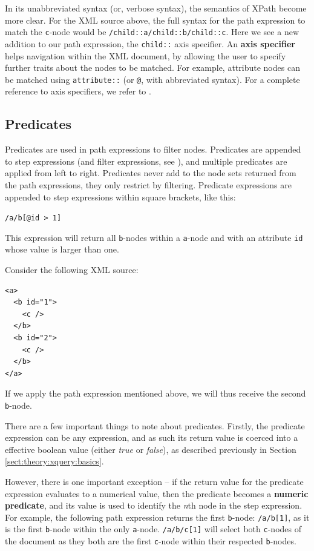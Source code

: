In its unabbreviated syntax (or, verbose syntax), the semantics of XPath
become more clear. For the XML source above, the full syntax for the path
expression to match the \verb!c!-node would be
\texttt{/child::a/child::b/child::c}. Here we see a new addition to our path
expression, the \verb!child::! axis specifier. An \textbf{axis specifier} helps
navigation within the XML document, by allowing the user to specify further
traits about the nodes to be matched. For example, attribute nodes can be
matched using \verb!attribute::! (or \verb!@!, with abbreviated syntax). For a
complete reference to axis specifiers, we refer to \cite{w3c01}.

\subsection{Predicates}
\label{sect:theory:xquery:Predicates}
Predicates are used in path expressions to filter nodes. Predicates are
appended to step expressions (and filter expressions, see \cite{w3c01}), and multiple predicates
are applied from left to right. Predicates never add to the node sets returned from the path expressions, they
only restrict by filtering. Predicate expressions are appended to step expressions within square brackets, like
this:
\begin{center}
\verb!/a/b[@id > 1]!
\end{center} 
This expression will return all \verb!b!-nodes within a \verb!a!-node and with an attribute \verb!id! whose value
is larger than one.

Consider the following XML source:
\begin{center}
\begin{minipage}[h]{3.2cm}
\begin{verbatim}
<a>
  <b id="1">
    <c />
  </b>
  <b id="2">
    <c />
  </b>
</a>
\end{verbatim}
\end{minipage}
\end{center}
If we apply the path expression mentioned above, we will thus receive the second
\verb!b!-node.

There are a few important things to note about predicates. Firstly, the
predicate expression can be any expression, and as such its return value is
coerced into a effective boolean value (either \textit{true} or \textit{false}), as
described previously in Section \ref{sect:theory:xquery:basics}.

However, there is one important exception -- if the return value for the
predicate expression evaluates to a numerical value, then the predicate
becomes a \textbf{numeric predicate}, and its value is used to identify the
\textit{n}th node in the step expression. For example, the following path
expression returns the first \verb!b!-node: \verb!/a/b[1]!, as it is the first
\verb!b!-node within the only \verb!a!-node. \texttt{/a/b/c[1]} will select both \verb!c!-nodes of the document as they both are the first
\texttt{c}-node within their respected \texttt{b}-nodes.


